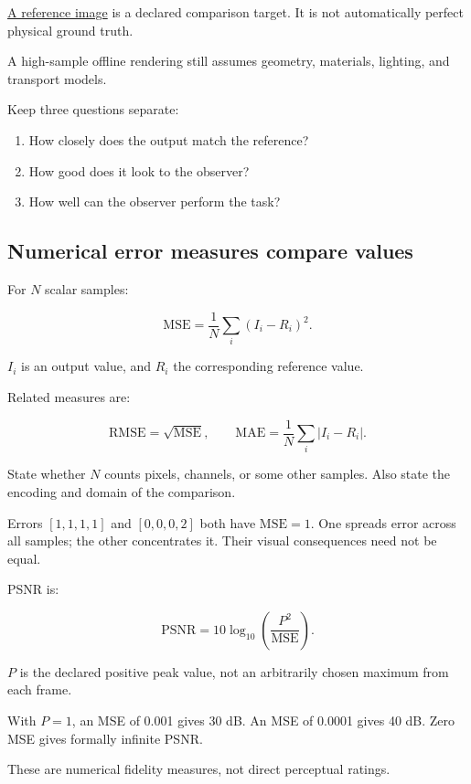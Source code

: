 \hyperref[appendix-b2c1846508bf]{A reference image} is a declared comparison target. It is not automatically perfect physical ground truth.

A high-sample offline rendering still assumes geometry, materials, lighting, and transport models.

Keep three questions separate:

\begin{enumerate}
\def\labelenumi{\arabic{enumi}.}
\tightlist
\item
  How closely does the output match the reference?
\item
  How good does it look to the observer?
\item
  How well can the observer perform the task?
\end{enumerate}

\subsection{Numerical error measures compare values}\label{04-visual-computing-ii-ch043-numerical-error-measures-compare-values}

For \(N\) scalar samples:

\[
\mathrm{MSE}=\frac1N\sum_i(I_i-R_i)^2.
\]

\(I_i\) is an output value, and \(R_i\) the corresponding reference value.

Related measures are:

\[
\mathrm{RMSE}=\sqrt{\mathrm{MSE}},
\qquad
\mathrm{MAE}=\frac1N\sum_i|I_i-R_i|.
\]

State whether \(N\) counts pixels, channels, or some other samples. Also state the encoding and domain of the comparison.

Errors \([1,1,1,1]\) and \([0,0,0,2]\) both have \(\mathrm{MSE}=1\). One spreads error across all samples; the other concentrates it. Their visual consequences need not be equal.

PSNR is:

\[
\mathrm{PSNR}
=10\log_{10}\left(\frac{P^2}{\mathrm{MSE}}\right).
\]

\(P\) is the declared positive peak value, not an arbitrarily chosen maximum from each frame.

With \(P=1\), an MSE of 0.001 gives 30 dB. An MSE of 0.0001 gives 40 dB. Zero MSE gives formally infinite PSNR.

These are numerical fidelity measures, not direct perceptual ratings.


